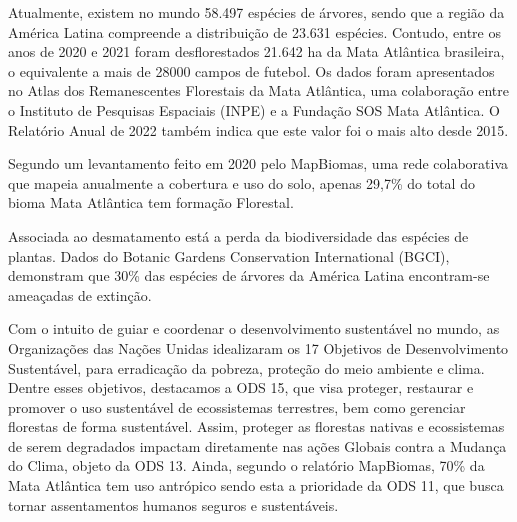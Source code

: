 Atualmente, existem no mundo 58.497 espécies de árvores, sendo que a região da América Latina compreende a distribuição de 23.631 espécies.\cite{bgci} Contudo, entre os anos de 2020 e 2021 foram desflorestados 21.642 ha da Mata Atlântica brasileira, o equivalente a mais de 28000 campos de futebol. Os dados foram apresentados no Atlas dos Remanescentes Florestais da Mata Atlântica, uma colaboração entre o Instituto de Pesquisas Espaciais (INPE) e a Fundação SOS Mata Atlântica. O Relatório Anual de 2022 também indica que este valor foi o mais alto desde 2015.\cite{atlas-mata-atlantica}

Segundo um levantamento feito  em 2020 pelo MapBiomas, uma rede colaborativa que mapeia anualmente a cobertura e uso do solo, apenas 29,7\% do total do bioma Mata Atlântica tem formação Florestal.\cite{mapbiomas}

Associada ao desmatamento está a perda da biodiversidade das espécies de plantas. Dados do Botanic Gardens Conservation International (BGCI), demonstram que 30\% das espécies de árvores da América Latina encontram-se ameaçadas de extinção.\cite{bgci}

Com o intuito de guiar e coordenar o desenvolvimento sustentável no mundo, as Organizações das Nações Unidas idealizaram os 17 Objetivos de Desenvolvimento Sustentável, para erradicação da pobreza, proteção do meio ambiente e clima. Dentre esses objetivos, destacamos a ODS 15, que visa proteger, restaurar e promover o uso sustentável de ecossistemas terrestres, bem como gerenciar florestas de forma sustentável. Assim, proteger as florestas nativas e ecossistemas de serem degradados impactam diretamente nas ações Globais contra a Mudança do Clima, objeto da ODS 13. Ainda, segundo o relatório MapBiomas, 70\% da Mata Atlântica tem uso antrópico sendo esta a prioridade da ODS 11, que busca tornar assentamentos humanos seguros e sustentáveis.\cite{agenda2030}

